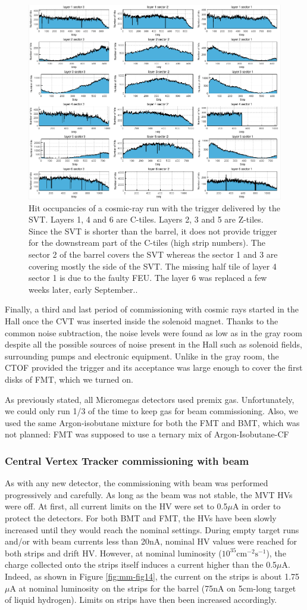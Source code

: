 \begin{figure}[htb]
 \includegraphics[width=.45\textwidth]{images/fig10}
 \caption{Hit occupancies of a cosmic-ray run with the trigger delivered by the SVT. Layers 1, 4 and 6 are C-tiles. 
Layers 2, 3 and 5 are Z-tiles. Since the SVT is shorter than the barrel, it does not provide trigger for the downstream 
part of the C-tiles (high strip numbers). The sector 2 of the barrel covers the SVT whereas the sector 1 and 3 are 
covering mostly the side of the SVT. The missing half tile of layer 4 sector 1 is due to the faulty FEU. The layer 6 
was replaced a few weeks later, early September..}
 \label{fig:mm-fig10}
\end{figure}

Finally, a third and last period of commissioning with cosmic rays started in the Hall once the CVT was inserted inside 
the solenoid magnet. Thanks to the common noise subtraction, the noise levels were found as low as in the gray room 
despite all the possible sources of noise present in the Hall such as solenoid fields, surrounding pumps and electronic 
equipment. Unlike in the gray room, the CTOF provided the trigger and its acceptance was large enough to cover the 
first disks of FMT, which we turned on. 

As previously stated, all Micromegas detectors used premix gas. Unfortunately, we could only run 1/3 of the time to 
keep gas for beam commissioning. Also, we used the same Argon-isobutane mixture for both the FMT and BMT, which was not 
planned: FMT was supposed to use a ternary mix of Argon-Isobutane-CF


\subsubsection{Central Vertex Tracker commissioning with beam}

As with any new detector, the commissioning with beam was performed progressively and carefully. As long as the beam 
was not stable, the MVT HVs were off. At first, all current limits on the HV were set to 0.5$\mu$A in order to protect 
the detectors. For both BMT and FMT, the HVs have been slowly increased until they would reach the nominal settings. 
During empty target runs and/or with beam currents less than 20nA, nominal HV values were reached for both strips and 
drift HV. However, at nominal luminosity ($10^{35}\text{cm}^{-2}\text{s}^{-1}$), the charge collected onto the strips 
itself induces a current higher than the 0.5$\mu$A. Indeed, as shown in Figure \ref{fig:mm-fig14}, the current on the 
strips is about 1.75 $\mu$A at nominal luminosity on the strips for the barrel (75nA on 5cm-long target of liquid 
hydrogen). Limits on strips have then been increased accordingly.

